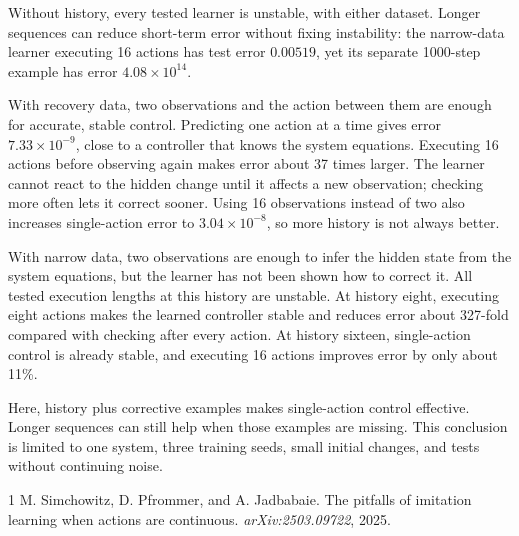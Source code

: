 \documentclass{l4dc2026}
\begin{document}
Without history, every tested learner is unstable, with either dataset. Longer sequences can reduce short-term error without fixing instability: the narrow-data learner executing 16 actions has test error $0.00519$, yet its separate 1000-step example has error $4.08\times10^{14}$.

With recovery data, two observations and the action between them are enough for accurate, stable control. Predicting one action at a time gives error $7.33\times10^{-9}$, close to a controller that knows the system equations. Executing 16 actions before observing again makes error about 37 times larger. The learner cannot react to the hidden change until it affects a new observation; checking more often lets it correct sooner. Using 16 observations instead of two also increases single-action error to $3.04\times10^{-8}$, so more history is not always better.

With narrow data, two observations are enough to infer the hidden state from the system equations, but the learner has not been shown how to correct it. All tested execution lengths at this history are unstable. At history eight, executing eight actions makes the learned controller stable and reduces error about 327-fold compared with checking after every action. At history sixteen, single-action control is already stable, and executing 16 actions improves error by only about 11\%.

Here, history plus corrective examples makes single-action control effective. Longer sequences can still help when those examples are missing. This conclusion is limited to one system, three training seeds, small initial changes, and tests without continuing noise.

\footnotesize
\begin{thebibliography}{1}
M. Simchowitz, D. Pfrommer, and A. Jadbabaie.
The pitfalls of imitation learning when actions are continuous.
\emph{arXiv:2503.09722}, 2025.
\end{thebibliography}
\end{document}
